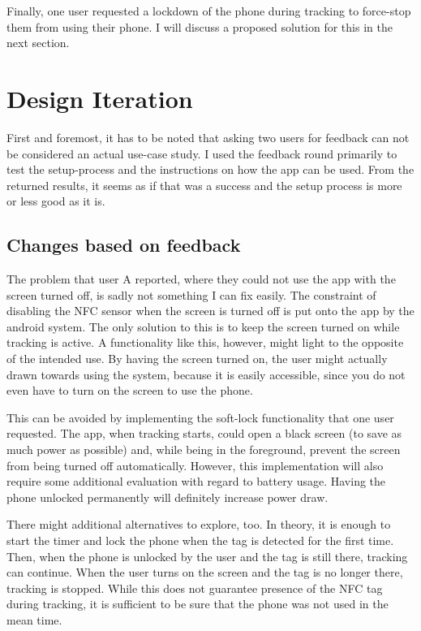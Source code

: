 \documentclass[conference]{IEEEtran}
\begin{document}
Finally, one user requested a lockdown of the phone during tracking to force-stop them from using their phone. I will discuss a proposed solution for this in the next section.

\section{Design Iteration}
First and foremost, it has to be noted that asking two users for feedback can not be considered an actual use-case study. I used the feedback round primarily to test the setup-process and the instructions on how the app can be used. From the returned results, it seems as if that was a success and the setup process is more or less good as it is.

\subsection{Changes based on feedback}
The problem that user A reported, where they could not use the app with the screen turned off, is sadly not something I can fix easily. The constraint of disabling the NFC sensor when the screen is turned off is put onto the app by the android system. The only solution to this is to keep the screen turned on while tracking is active. A functionality like this, however, might light to the opposite of the intended use. By having the screen turned on, the user might actually drawn towards using the system, because it is easily accessible, since you do not even have to turn on the screen to use the phone.

This can be avoided by implementing the soft-lock functionality that one user requested. The app, when tracking starts, could open a black screen (to save as much power as possible) and, while being in the foreground, prevent the screen from being turned off automatically.
However, this implementation will also require some additional evaluation with regard to battery usage. Having the phone unlocked permanently will definitely increase power draw.

There might additional alternatives to explore, too. In theory, it is enough to start the timer and lock the phone when the tag is detected for the first time. Then, when the phone is unlocked by the user and the tag is still there, tracking can continue. When the user turns on the screen and the tag is no longer there, tracking is stopped. While this does not guarantee presence of the NFC tag during tracking, it is sufficient to be sure that the phone was not used in the mean time.
\end{document}
